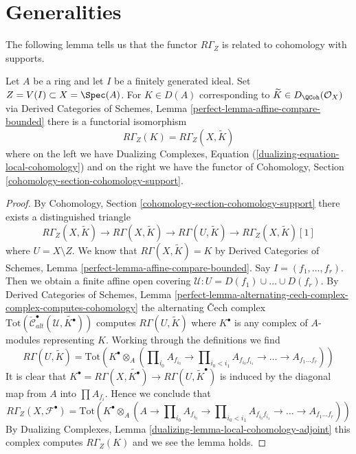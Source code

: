 \section{Generalities}
\label{section-generalities}

\noindent
The following lemma tells us that the functor $R\Gamma_Z$
is related to cohomology with supports.

\begin{lemma}
\label{lemma-local-cohomology-is-local-cohomology}
Let $A$ be a ring and let $I$ be a finitely generated ideal.
Set $Z = V(I) \subset X = \Spec(A)$. For $K \in D(A)$ corresponding
to $\widetilde{K} \in D_\QCoh(\mathcal{O}_X)$ via
Derived Categories of Schemes, Lemma \ref{perfect-lemma-affine-compare-bounded}
there is a functorial isomorphism
$$
R\Gamma_Z(K) = R\Gamma_Z(X, \widetilde{K})
$$
where on the left we have
Dualizing Complexes, Equation (\ref{dualizing-equation-local-cohomology})
and on the right we have the functor of
Cohomology, Section \ref{cohomology-section-cohomology-support}.
\end{lemma}

\begin{proof}
By Cohomology, Section \ref{cohomology-section-cohomology-support}
there exists a distinguished triangle
$$
R\Gamma_Z(X, \widetilde{K})
\to R\Gamma(X, \widetilde{K})
\to R\Gamma(U, \widetilde{K})
\to R\Gamma_Z(X, \widetilde{K})[1]
$$
where $U = X \setminus Z$. We know that $R\Gamma(X, \widetilde{K}) = K$
by Derived Categories of Schemes, Lemma
\ref{perfect-lemma-affine-compare-bounded}.
Say $I = (f_1, \ldots, f_r)$. Then we obtain a finite affine
open covering $\mathcal{U} : U = D(f_1) \cup \ldots \cup D(f_r)$.
By Derived Categories of Schemes, Lemma
\ref{perfect-lemma-alternating-cech-complex-complex-computes-cohomology}
the alternating {\v C}ech complex
$\text{Tot}(\check{\mathcal{C}}_{alt}^\bullet(\mathcal{U},
\widetilde{K^\bullet}))$
computes $R\Gamma(U, \widetilde{K})$ where $K^\bullet$ is any
complex of $A$-modules representing $K$. Working through the
definitions we find
$$
R\Gamma(U, \widetilde{K}) =
\text{Tot}\left(
K^\bullet \otimes_A
(\prod\nolimits_{i_0} A_{f_{i_0}} \to
\prod\nolimits_{i_0 < i_1} A_{f_{i_0}f_{i_1}} \to
\ldots \to A_{f_1\ldots f_r})\right)
$$
It is clear that
$K^\bullet = R\Gamma(X, \widetilde{K^\bullet}) \to
R\Gamma(U, \widetilde{K}^\bullet)$
is induced by the diagonal map from $A$ into $\prod A_{f_i}$.
Hence we conclude that
$$
R\Gamma_Z(X, \mathcal{F}^\bullet) =
\text{Tot}\left(
K^\bullet \otimes_A
(A \to \prod\nolimits_{i_0} A_{f_{i_0}} \to
\prod\nolimits_{i_0 < i_1} A_{f_{i_0}f_{i_1}} \to
\ldots \to A_{f_1\ldots f_r})\right)
$$
By Dualizing Complexes, Lemma \ref{dualizing-lemma-local-cohomology-adjoint}
this complex computes $R\Gamma_Z(K)$ and we see the lemma holds.
\end{proof}

